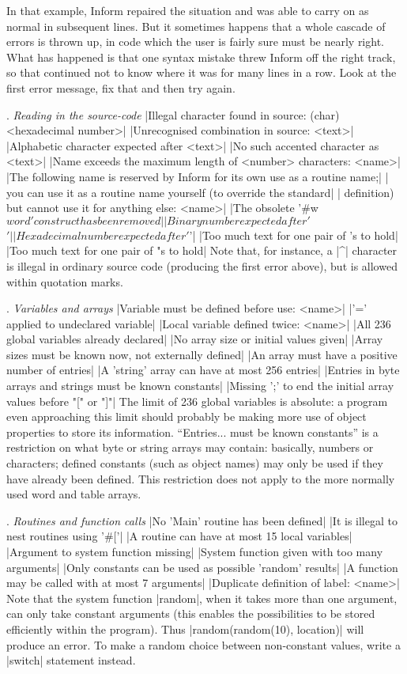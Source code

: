 In that example, Inform repaired the situation and was able to carry on as normal
in subsequent lines.  But it sometimes happens that a whole cascade of errors
is thrown up, in code which the user is fairly sure must be nearly right.  What
has happened is that one syntax mistake threw Inform off the right track, so that
continued not to know where it was for many lines in a row.  Look at the first
error message, fix that and then try again.

\medskip{}. {\sl Reading in the source-code}
\beginlines
|Illegal character found in source: (char) <hexadecimal number>|
|Unrecognised combination in source: <text>|
|Alphabetic character expected after <text>|
|No such accented character as <text>|
|Name exceeds the maximum length of <number> characters: <name>|
|The following name is reserved by Inform for its own use as a routine name;|
|    you can use it as a routine name yourself (to override the standard|
|    definition) but cannot use it for anything else: <name>|
|The obsolete '#w$word' construct has been removed|
|Binary number expected after '$$'|
|Hexadecimal number expected after '$'|
|Too much text for one pair of 's to hold|
|Too much text for one pair of "s to hold|
\endlines
Note that, for instance, a |^| character is illegal in ordinary source
code (producing the first error above), but is allowed within quotation
marks.

\medskip{}. {\sl Variables and arrays}
\beginlines
|Variable must be defined before use: <name>|
|'=' applied to undeclared variable|
|Local variable defined twice: <name>|
|All 236 global variables already declared|
|No array size or initial values given|
|Array sizes must be known now, not externally defined|
|An array must have a positive number of entries|
|A 'string' array can have at most 256 entries|
|Entries in byte arrays and strings must be known constants|
|Missing ';' to end the initial array values before "[" or "]"|
\endlines
The limit of 236 global variables is absolute: a program even approaching this
limit should probably be making more use of object properties to store its
information.  ``Entries... must be known constants'' is a restriction on what
byte or string arrays may contain: basically, numbers or characters; defined
constants (such as object names) may only be used if they have already been
defined.  This restriction does not apply to the more normally used word and
table arrays.

\medskip{}. {\sl Routines and function calls}
\beginlines
|No 'Main' routine has been defined|
|It is illegal to nest routines using '#['|
|A routine can have at most 15 local variables|
|Argument to system function missing|
|System function given with too many arguments|
|Only constants can be used as possible 'random' results|
|A function may be called with at most 7 arguments|
|Duplicate definition of label: <name>|
\endlines
Note that the system function |random|, when it takes more than one
argument, can only take constant arguments (this enables the possibilities
to be stored efficiently within the program).  Thus
|random(random(10), location)| will produce an error.  To make a
random choice between non-constant values, write a |switch| statement instead.

